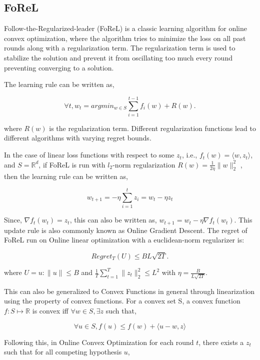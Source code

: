 \subsection{FoReL}

Follow-the-Regularized-leader (FoReL) is a classic learning algorithm for online convex optimization, where the algorithm tries to minimize the loss on 
all past rounds along with a regularization term. The regularization term is used to stabilize the solution and prevent it from oscillating too much every 
round preventing converging to a solution.

The learning rule can be written as,

$$\forall t, w_t = argmin_{w \in S} \sum_{i=1}^{t-1} f_i(w) + R(w).$$

where $R(w)$ is the regularization term. Different regularization functions lead to different algorithms with varying regret bounds.


In the case of linear loss functions with respect to some $z_t$, i.e., $f_t(w) = \langle w, z_t \rangle$, and $S=\mathbb{R}^d$,  if FoReL is run with 
$l_2$-norm regularization $R(w) = \frac{1}{2 \eta} \|w\|_2^2$ , then the learning rule can be written as,

\begin{equation}
    w_{t+1} = -\eta \sum_{i=1}^t z_i = w_t - \eta z_t
\end{equation}

Since, $\nabla f_t(w_t) = z_t$, this can also be written as, $w_{t+1} = w_t - \eta \nabla f_t(w_t)$. This update rule is also commonly known as Online Gradient Descent.
The regret of FoReL run on Online linear optimization with a euclidean-norm regularizer is:

$$Regret_T(U) \leq BL \sqrt {2T}.$$

where $U = {u : \|u\| \leq B}$ and $\frac{1}{T} \sum_{t=1}^T \|z_t\|_2^2 \leq L^2$ with $\eta = \frac{B}{L\sqrt{2T}}$.

This can also be generalized to Convex Functions in general through linearization using the property of convex functions. For a convex set S, a convex function $f: S \mapsto \mathbb{R}$ is convex iff $\forall w \in S, \exists z$ such that,

\begin{equation}
    \forall u \in S, f(u) \leq f(w) + \langle u-w, z \rangle  
\end{equation}

Following this, in Online Convex Optimization for each round $t$, there exists a $z_t$ such that for all competing hypothesis $u$, 

